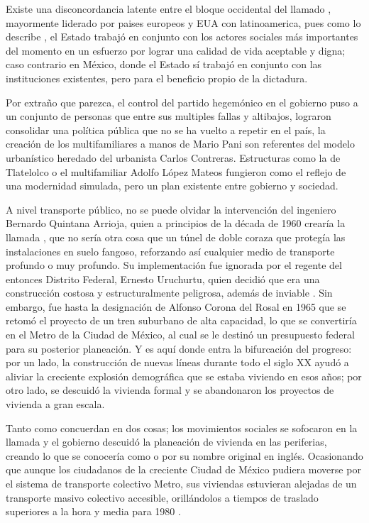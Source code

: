 Existe una disconcordancia latente entre el bloque occidental del llamado , mayormente liderado por paises europeos y EUA con latinoamerica,
pues como lo describe \cite{topalov_cuestion}, el Estado trabajó en conjunto con los actores sociales más importantes del momento en un esfuerzo por lograr una calidad de vida
aceptable y digna; caso contrario en México, donde el Estado sí trabajó en conjunto con las instituciones existentes, pero para el beneficio propio de la dictadura.


Por extraño que parezca, el control del partido hegemónico en el gobierno puso a un conjunto de personas que entre sus multiples fallas y altibajos, lograron consolidar una 
política pública que no se ha vuelto a repetir en el país, la creación de los multifamiliares a manos de Mario Pani son referentes del modelo urbanístico heredado del
urbanista Carlos Contreras. Estructuras como la de Tlatelolco o el multifamiliar Adolfo López Mateos fungieron como el reflejo de una modernidad simulada, pero un plan
existente entre gobierno y sociedad.


A nivel transporte público, no se puede olvidar la intervención del ingeniero Bernardo Quintana Arrioja, quien a principios de la década de 1960 crearía la llamada ,
que no sería otra cosa que un túnel de doble coraza que protegía las instalaciones en suelo fangoso, reforzando así cualquier medio de transporte profundo o muy profundo.
Su implementación fue ignorada por el regente del entonces Distrito Federal, Ernesto Uruchurtu, quien decidió que era una construcción costosa y estructuralmente
peligrosa, además de inviable \cite{perlo2023}. Sin embargo, fue hasta la designación de Alfonso Corona del Rosal en 1965 que se retomó el proyecto de
un tren suburbano de alta capacidad, lo que se convertiría en el Metro de la Ciudad de México, al cual se le destinó un presupuesto federal para su posterior planeación.
Y es aquí donde entra la bifurcación del progreso: por un lado, la construcción de nuevas líneas durante todo el siglo XX ayudó a aliviar la creciente explosión demográfica
que se estaba viviendo en esos años; por otro lado, se descuidó la vivienda formal y se abandonaron los proyectos de vivienda a gran escala.


Tanto \cite{agustin_tragicomedia1} como \cite{molina2018} concuerdan en dos cosas; los movimientos sociales se sofocaron en la llamada  y el gobierno 
descuidó la planeación de vivienda en las periferias, creando lo que se conocería como  o  \cite{jia2010} 
por su nombre original en inglés. Ocasionando que aunque los ciudadanos de la creciente Ciudad de México pudiera moverse por el sistema de transporte colectivo Metro, 
sus viviendas estuvieran alejadas de un transporte masivo colectivo accesible, orillándolos a tiempos de traslado superiores a la hora y media para 1980 
\cite{salinas1980produccion}.


